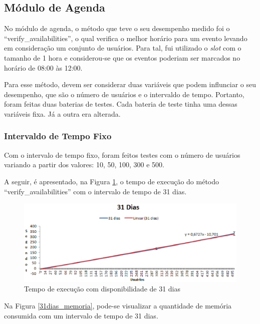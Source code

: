 \subsection{Módulo de Agenda}

No módulo de agenda, o método que teve o seu desempenho medido foi o ``verify\_availabilities'', o qual verifica o melhor horário para um evento levando em consideração um conjunto de usuários. Para tal, fui utilizado o \textit{slot} com o tamanho de 1 hora e considerou-se que os eventos poderiam ser marcados no horário de 08:00 às 12:00.

Para esse método, devem ser considerar duas variáveis que podem influnciar o seu desempenho, que são o número de usuários e o intervaldo de tempo. Portanto, foram feitas duas baterias de testes. Cada bateria de teste tinha uma dessas variáveis fixa. Já a outra era alterada.

\subsubsection{Intervaldo de Tempo Fixo}

Com o intervalo de tempo fixo, foram feitos testes com o número de usuários variando a partir dos valores: 10, 50, 100, 300 e 500.

A seguir, é apresentado, na Figura \ref{31dias_tempo}, o tempo de execução do método ``verify\_availabilities'' com o intervalo de tempo de 31 dias.

\begin{figure}[!h]
	\centering
	\includegraphics[scale=0.55]{figuras/resultados/graficos/31_dias_tempo.eps}
	\caption[Tempo de execução com disponibilidade de 31 dias]{Tempo de execução com disponibilidade de 31 dias}
	\label{31dias_tempo}
\end{figure}

Na Figura \ref{31dias_memoria}, pode-se visualizar a quantidade de memória consumida com um intervalo de tempo de 31 dias.

